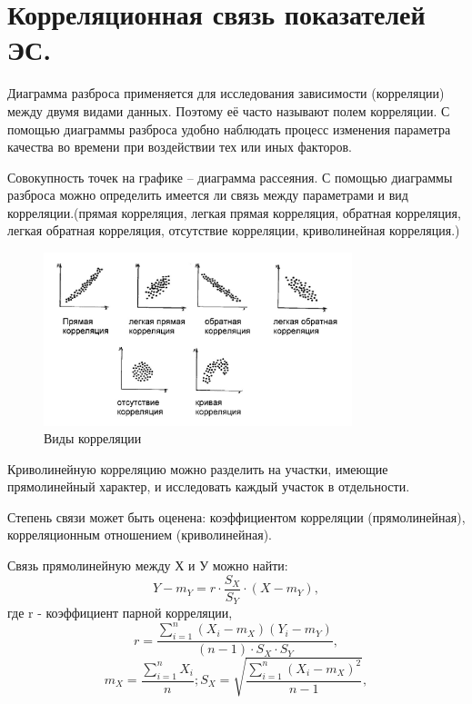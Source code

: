 \documentclass[unicode, 12pt, a4paper, oneside]{article}
\begin{document}
\section{Корреляционная связь показателей ЭС.}

Диаграмма разброса применяется для исследования зависимости (корреляции) между двумя видами данных. Поэтому её часто называют полем корреляции.
С помощью диаграммы разброса удобно наблюдать процесс изменения параметра качества во времени при воздействии тех или иных факторов.

Совокупность точек на графике – диаграмма рассеяния.
С помощью диаграммы разброса можно определить имеется ли связь между параметрами и вид корреляции.(прямая корреляция, легкая прямая корреляция, обратная корреляция, легкая обратная корреляция, отсутствие корреляции, криволинейная корреляция.)

 \begin{figure}
 \centering 
 \includegraphics[width=0.8\textwidth]{34_Korelyacia2.JPG}
 \caption{Виды корреляции}
 \end{figure}
 
 Криволинейную корреляцию можно разделить на участки, имеющие прямолинейный характер, и исследовать каждый участок в отдельности.
 
 Степень связи может быть оценена: коэффициентом корреляции (прямолинейная), корреляционным отношением (криволинейная).
 
 Связь прямолинейную между Х и У можно найти:
 \begin{equation}
 Y-m_Y = r \cdot \frac{S_X}{S_Y} \cdot (X-m_Y),
 \end{equation}
 где r - коэффициент парной корреляции,
 \begin{equation}
 r = \frac{\sum_{i=1}^n (X_i - m_X)(Y_i-m_Y)}{(n-1) \cdot S_X \cdot S_Y},
 \end{equation} 
 \begin{equation}
 m_X = \dfrac{\sum_{i=1}^n X_i}{n}; S_X=\sqrt{\dfrac{\sum_{i=1}^n (X_i -m_X)^2}{n-1}},
 \end{equation}
 
\end{document}
